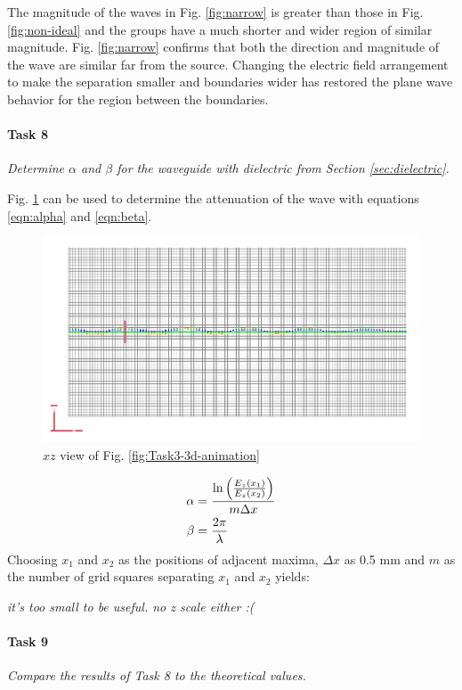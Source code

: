 The magnitude of the waves in Fig. \ref{fig:narrow} is greater than those in Fig. \ref{fig:non-ideal} and the groups have a much shorter and wider region of similar magnitude.
Fig. \ref{fig:narrow} confirms that both the direction and magnitude of the wave are similar far from the source.
Changing the electric field arrangement to make the separation smaller and boundaries wider has restored the plane wave behavior for the region between the boundaries.

\paragraph{Task 8} \textit{Determine $\alpha$ and $\beta$ for the waveguide with dielectric from Section \ref{sec:dielectric}.}

Fig. \ref{fig:Task3-mesh} can be used to determine the attenuation of the wave with equations \eqref{eqn:alpha} and \eqref{eqn:beta}.

\begin{figure}[tbph]
	\centering
	\includegraphics[width=0.7\linewidth]{graphics/Task3-mesh}
	\caption{$xz$ view of Fig. \ref{fig:Task3-3d-animation}}
	\label{fig:Task3-mesh}
\end{figure}
\begin{align}
	\alpha &= { \ln \left( { E_z(x_1) \over E_z(x_2) } \right) \over m \Delta x } \label{eqn:alpha} \\
	\beta &= { 2 \pi \over \lambda } \label{eqn:beta}
\end{align}
Choosing $x_1$ and $x_2$ as the positions of adjacent maxima, $\Delta x$ as 0.5 mm and $m$ as the number of grid squares separating $x_1$ and $x_2$ yields:

\textit{it's too small to be useful. no z scale either :(}

\paragraph{Task 9} \textit{Compare the results of Task 8 to the theoretical values.}

